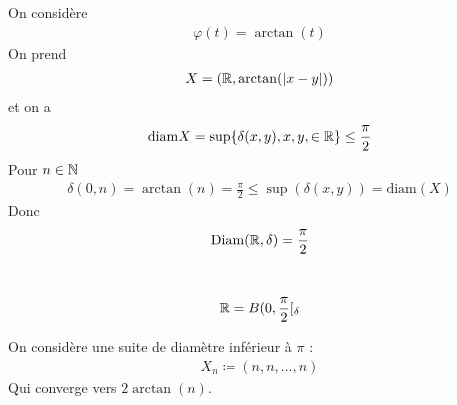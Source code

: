 \documentclass[french,a4paper,10pt]{article}
\begin{document}
	\begin{td-sol}
		On considère 
		\[\begin{aligned}
			\varphi(t)=\arctan(t)
		\end{aligned}\]
		On prend 
			\[\begin{gathered}
				X=\left(\mathbb{R},\arctan(|x-y|)\right)
			\end{gathered}\]
		et on a
			\[\begin{gathered}
				\text{diam} X=\sup\{\delta(x,y),x,y,\in\mathbb{R}\}\le\frac\pi2
			\end{gathered}\]
		Pour $n\in\mathbb{N}$
			\[\begin{gathered}
				\delta(0,n)=\arctan(n)=\frac\pi2\le\sup(\delta(x,y))=\text{diam}(X)
			\end{gathered}\]
		Donc
			\[\begin{aligned}
				\text{Diam}(\mathbb{R},\delta)=\frac\pi2
			\end{aligned}\]
		\begin{no-num-remark}\,
			\[\begin{aligned}
				\mathbb{R}=B({0,\frac\pi2}\mathopen{}[\mathclose{}_\delta
			\end{aligned}\]
			
		\end{no-num-remark}
		On considère une suite de diamètre inférieur à $\pi$ : 
			\[\begin{aligned}
				X_n\coloneq (n,n,\dots,n)
			\end{aligned}\]
		Qui converge vers $2\arctan(n)$.
	\end{td-sol}
	
\end{document}
